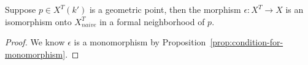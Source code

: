 \begin{lemma}\label{rl-000O}
  Suppose $p\in X^{T}(k')$ is a geometric point, then the morphism $\epsilon:X^{T}\to X$ is an isomorphism onto $X^T_{naive}$ in a formal neighborhood of $p$.
\end{lemma}
\begin{proof}
  We know $\epsilon$ is a monomorphism by Proposition~\ref{prop:condition-for-monomorphism}. 
\end{proof}
